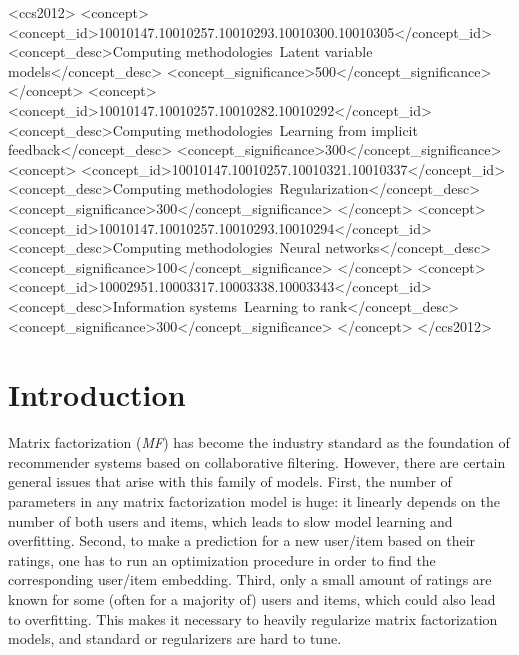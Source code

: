 \documentclass[sigconf,authorversion]{acmart}
\begin{document}
\begin{CCSXML}
<ccs2012>
<concept>
<concept_id>10010147.10010257.10010293.10010300.10010305</concept_id>
<concept_desc>Computing methodologies~Latent variable models</concept_desc>
<concept_significance>500</concept_significance>
</concept>
<concept>
<concept_id>10010147.10010257.10010282.10010292</concept_id>
<concept_desc>Computing methodologies~Learning from implicit feedback</concept_desc>
<concept_significance>300</concept_significance>
<concept>
<concept_id>10010147.10010257.10010321.10010337</concept_id>
<concept_desc>Computing methodologies~Regularization</concept_desc>
<concept_significance>300</concept_significance>
</concept>
<concept>
<concept_id>10010147.10010257.10010293.10010294</concept_id>
<concept_desc>Computing methodologies~Neural networks</concept_desc>
<concept_significance>100</concept_significance>
</concept>
<concept>
<concept_id>10002951.10003317.10003338.10003343</concept_id>
<concept_desc>Information systems~Learning to rank</concept_desc>
<concept_significance>300</concept_significance>
</concept>
</ccs2012>
\end{CCSXML}



\maketitle

\section{Introduction}

Matrix factorization (\emph{MF}) has become the industry standard as the foundation of recommender systems based on collaborative filtering. However, there are certain general issues that arise with this family of models. First, the number of parameters in any matrix factorization model is huge: it linearly depends on the number of both users and items, which leads to slow model learning and overfitting. Second, to make a prediction for a new user/item based on their ratings, one has to run an optimization procedure in order to find the corresponding user/item embedding. Third, only a small amount of ratings are known for some (often for a majority of) users and items, which could also lead to overfitting. This makes it necessary to heavily regularize matrix factorization models, and standard  or  regularizers are hard to tune.
\end{document}
